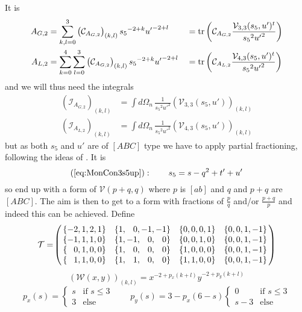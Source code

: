 It is
\begin{align}
A_{G,2} &= \sum_{k,l=0}^{3} \left(\mathcal C_{A_{G,2}}\right)_{(k,l)} {s_5}^{-2+k} {u'}^{-2+l} &&= \operatorname{\text{tr}}\left(\mathcal C_{A_{G,2}} \frac{\mathcal V_{3,3}(s_5,u')^t}{{s_5}^2{u'}^2}\right)\\
A_{L,2} &= \sum_{k=0}^{4}\sum_{l=0}^3 \left(\mathcal C_{A_{G,2}}\right)_{(k,l)} {s_5}^{-2+k} {u'}^{-2+l} &&= \operatorname{\text{tr}}\left(\mathcal C_{A_{L,2}} \frac{\mathcal V_{4,3}(s_5,u')^t}{{s_5}^2{u'}^2}\right)
\end{align}
and we will thus need the integrals
\begin{align}
\left(\mathcal I_{A_{G,2}}\right)_{(k,l)} &= \int\!d\Omega_n\,\frac 1 {{s_5}^2{u'}^2}\left(\mathcal V_{3,3}(s_5,u')\right)_{(k,l)}\\
\left(\mathcal I_{A_{L,2}}\right)_{(k,l)} &= \int\!d\Omega_n\,\frac 1 {{s_5}^2{u'}^2}\left(\mathcal V_{4,3}(s_5,u')\right)_{(k,l)}
\end{align}
but as both $s_5$ and $u'$ are of $[ABC]$ type we have to apply partial fractioning, following the ideas of \cite[Ch. 5]{Bojak:2000eu}. It is 
\begin{equation}
(\ref{eq:MonCon3s5up}): \qquad s_5 = s-q^2+t'+u'
\end{equation}
so end up with a form of $\mathcal V(p+q,q)$ where $p$ is $[ab]$ and $q$ and $p+q$ are $[ABC]$. The aim is then to get to a form with fractions of $\frac p q$ and/or $\frac {p+q} p$ and indeed this can be achieved. Define
\begin{equation}
\mathcal T =\!\left(\!\!
\begin{array}{cccc}
\{-2,1,2,1\} & \{1,\hphantom{-} 0,-1,-1\} & \{0,0,0,1\} & \{0,0,1,-1\}\\
\{-1,1,1,0\} & \{1,-1,\hphantom{-} 0,\hphantom{-} 0\}  & \{0,0,1,0\} & \{0,0,1,-1\}\\
\{\hphantom{-} 0,1,0,0\}  & \{1,\hphantom{-} 0,\hphantom{-} 0,\hphantom{-} 0\}   & \{1,0,0,0\} & \{0,0,1,-1\}\\
\{\hphantom{-} 1,1,0,0\}  & \{1,\hphantom{-} 1,\hphantom{-} 0,\hphantom{-} 0\}   & \{1,1,0,0\} & \{0,0,1,-1\}
\end{array}\!\!
\right)
\end{equation}
\begin{equation}
\left(\mathcal W(x,y)\right)_{(k,l)} = x^{-2+p_x(k+l)} y^{-2+p_y(k+l)}
\end{equation}
\begin{equation}
p_x(s) = \left\{\begin{array}{ll}s&\text{if }s\leq 3\\ 3 &\text{else}\end{array}\right.
\qquad
p_y(s) = 3-p_x(6-s)\left\{\begin{array}{ll}0&\text{if }s\leq 3\\ s-3 &\text{else}\end{array}\right.
\end{equation}

